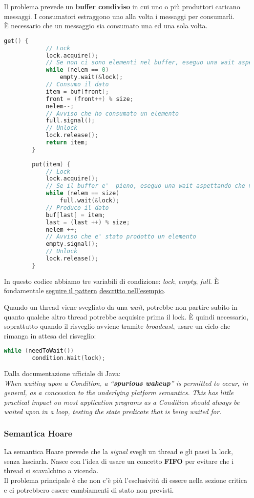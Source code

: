 \begin{example}
	\label{example:prodcons}
	Il problema prevede un \textbf{buffer condiviso} in cui uno o più produttori caricano messaggi. I consumatori estraggono uno alla volta i messaggi per consumarli.\\
	È necessario che un messaggio sia consumato una ed una sola volta.
	\begin{lstlisting}[language=C]
		get() {
			// Lock
			lock.acquire();
			// Se non ci sono elementi nel buffer, eseguo una wait aspettando che arrivi qualcosa
			while (nelem == 0)
				empty.wait(&lock);
			// Consumo il dato
			item = buf[front];
			front = (front++) % size;
			nelem--;
			// Avviso che ho consumato un elemento
			full.signal();
			// Unlock
			lock.release();
			return item;
		}
		
		put(item) {
			// Lock
			lock.acquire();
			// Se il buffer e' 	pieno, eseguo una wait aspettando che venga consumato qualcosa
			while (nelem == size)
				full.wait(&lock);
			// Produco il dato
			buf[last] = item;
			last = (last ++) % size;
			nelem ++;
			// Avviso che e' stato prodotto un elemento
			empty.signal();
			// Unlock
			lock.release();
		}
	\end{lstlisting}
	In questo codice abbiamo tre variabili di condizione: \textit{lock}, \textit{empty}, \textit{full}. È fondamentale \underline{seguire il pattern} \underline{descritto nell'esempio}.
\end{example}
Quando un thread viene svegliato da una \textit{wait}, potrebbe non partire subito in quanto qualche altro thread potrebbe acquisire prima il lock. È quindi necessario, soprattutto quando il risveglio avviene tramite \textit{broadcast}, usare un ciclo che rimanga in attesa del risveglio:
\begin{lstlisting}[language=C]
	while (needToWait())
		condition.Wait(lock);
\end{lstlisting}
Dalla documentazione ufficiale di Java: \\
\textit{When waiting upon a Condition, a “\textbf{spurious wakeup}” is permitted to occur, in general, as a concession to the underlying platform semantics. This has little practical impact on most application programs as a Condition should always be waited upon in a loop, testing the state predicate that is being waited for.}

\subsubsection{Semantica Hoare}
La semantica Hoare prevede che la \textit{signal} svegli un thread e gli passi la lock, senza lasciarla. Nasce con l'idea di usare un concetto \textbf{FIFO} per evitare che i thread si scavalchino a vicenda.\\
Il problema principale è che non c'è più l'esclusività di essere nella sezione critica e ci potrebbero essere cambiamenti di stato non previsti.
